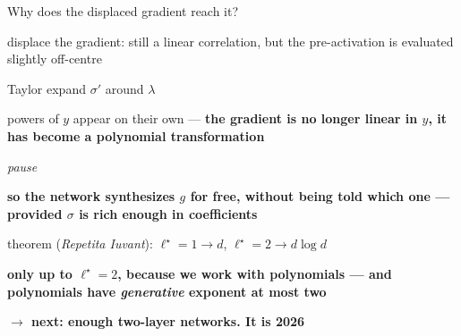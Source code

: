 \documentclass[aspectratio=169,11pt]{beamer}
\begin{document}
\begin{frame}{Why does the displaced gradient reach it?}
{\begin{notelist}
    \item displace the gradient: still a linear correlation, but the pre-activation
      is evaluated slightly off-centre
    \item Taylor expand $\sigma'$ around $\lambda$
    \item powers of $y$ appear on their own --- \textbf{the gradient is no longer
      linear in $y$, it has become a polynomial transformation}
    \item \emph{pause}
    \item \textbf{so the network synthesizes $g$ for free, without being told which
      one --- provided $\sigma$ is rich enough in coefficients}
    \item theorem (\emph{Repetita Iuvant}): $\ell^\star = 1 \to d$,
      $\ell^\star = 2 \to d\log d$
    \item \textbf{only up to $\ell^\star = 2$, because we work with polynomials ---
      and polynomials have \emph{generative} exponent at most two}
    \item \textbf{$\to$ next: enough two-layer networks. It is 2026}
  \end{notelist}}
\end{frame}
\end{document}
